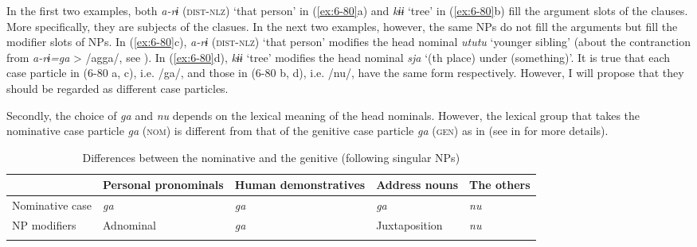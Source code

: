 In the first two examples, both \textit{a-rɨ} (\textsc{dist}-\textsc{nlz}) ‘that person’ in (\ref{ex:6-80}a) and \textit{kɨɨ} ‘tree’ in (\ref{ex:6-80}b) fill the argument slots of the clauses. More specifically, they are subjects of the clasues. In the next two examples, however, the same NPs do not fill the arguments but fill the modifier slots of NPs. In (\ref{ex:6-80}c), \textit{a-rɨ} (\textsc{dist}-\textsc{nlz}) ‘that person’ modifies the head nominal \textit{ututu} ‘younger sibling’ (about the contranction from \textit{a-rɨ=ga} > /agga/, see ). In (\ref{ex:6-80}d), \textit{kɨɨ} ‘tree’ modifies the head nominal \textit{sja} ‘(th place) under (something)’. It is true that each case particle in (6-80 a, c), i.e. /ga/, and those in (6-80 b, d), i.e. /nu/, have the same form respectively. However, I will propose that they should be regarded as different case particles.

Secondly, the choice of \textit{ga} and \textit{nu} depends on the lexical meaning of the head nominals. However, the lexical group that takes the nominative case particle \textit{ga} (\textsc{nom}) is different from that of the genitive case particle \textit{ga} (\textsc{gen}) as in  (see  in  for more details).


\begin{table}
\caption{\label{tab:key:41} Differences between the nominative and the genitive (following singular NPs)}
\begin{tabularx}{\textwidth}{XXXXX}
\lsptoprule
                       & Personal pronominals   & Human demonstratives  &  Address nouns  &  The others\\
\midrule
Nominative case         & \textit{ga}           &  \textit{ga}          &  \textit{ga}      &  \textit{nu}\\
NP modifiers            & Adnominal             & \textit{ga}           &  Juxtaposition  & \textit{nu}\\
\lspbottomrule
\end{tabularx}
\end{table}

